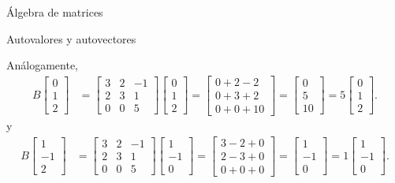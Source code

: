 \begin{chapter}{\'Algebra de matrices}
\begin{section}{Autovalores y autovectores}
\begin{ejemplo}
            Análogamente, 
            \begin{align*}
            B\begin{bmatrix}0\\1\\2\end{bmatrix} &= \begin{bmatrix}3&2&{ - 1}\\2&3&1\\0&0&5\end{bmatrix}\begin{bmatrix}0\\1\\2\end{bmatrix} = \begin{bmatrix}0+2-2\\0+3+2\\0+0+10\end{bmatrix} = \begin{bmatrix}0\\5\\10\end{bmatrix} = 5\begin{bmatrix}0\\1\\2\end{bmatrix}.
            \end{align*}
            y
            \begin{align*}
                B\begin{bmatrix}1\\-1\\2\end{bmatrix} &= \begin{bmatrix}3&2&{ - 1}\\2&3&1\\0&0&5\end{bmatrix}\begin{bmatrix}1\\-1\\0\end{bmatrix} = \begin{bmatrix}3-2+0\\2-3+0\\0+0+0\end{bmatrix} = \begin{bmatrix}1\\-1\\0\end{bmatrix} = 1\begin{bmatrix}1\\-1\\0\end{bmatrix}.
            \end{align*}


\end{ejemplo}
\end{section}
\end{chapter}
